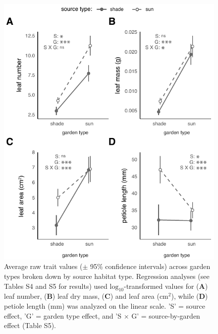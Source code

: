 \documentclass[11pt, oneside]{amsart}
\begin{document}
\begin{figure}[h]
\centering
\includegraphics[scale=0.8]{ESM_raw_data_v2}
\caption{Average raw trait values ($\pm$ 95\% confidence intervals) across garden types broken down by source habitat type. Regression analyses (see Tables S4 and S5 for results) used $\text{log}_{10}$-transformed values for (\textbf{A}) leaf number, (\textbf{B}) leaf dry mass, (\textbf{C}) and leaf area ($\text{cm}^{2}$), while (\textbf{D}) petiole length (mm) was analyzed on the linear scale. 'S' = source effect, 'G' = garden type effect, and 'S $\times$ G' = source-by-garden effect (Table S5).}
\label{FigS4}
\end{figure}

\clearpage
\end{document}
